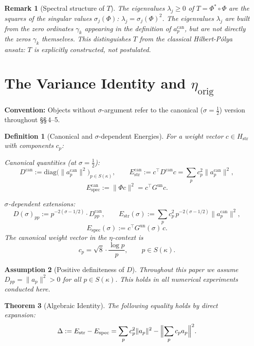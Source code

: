 \documentclass[11pt]{article}
\newtheorem{theorem}{Theorem}[section]
\newtheorem{definition}[theorem]{Definition}
\newtheorem{assumption}[theorem]{Assumption}
\newtheorem*{remark}{Remark}
\newcommand{\Hstr}{H_{\mathrm{str}}}
\newcommand{\Estr}{E_{\mathrm{str}}}
\newcommand{\Espec}{E_{\mathrm{spec}}}
\newcommand{\etaorig}{\eta_{\mathrm{orig}}}
\newcommand{\Gun}{G^{\mathrm{un}}}
\newcommand{\acan}{a_p^{\mathrm{can}}}
\newcommand{\Dcan}{D^{\mathrm{can}}}
\newcommand{\Estrcan}{\Estr^{\mathrm{can}}}
\newcommand{\Especcan}{\Espec^{\mathrm{can}}}
\begin{document}
\begin{remark}[Spectral structure of $T$]
The eigenvalues $\lambda_j\geq 0$ of $T=\Phi^*\circ\Phi$ are the squares of
the singular values $\sigma_j(\Phi)$: $\lambda_j=\sigma_j(\Phi)^2$.
The eigenvalues $\lambda_j$ are built from the zero ordinates $\gamma_k$
appearing in the definition of $\acan$, but are \emph{not} directly the zeros
$\gamma_k$ themselves. This distinguishes $T$ from the classical Hilbert-P\'olya
ansatz: $T$ is explicitly constructed, not postulated.
\end{remark}

\section{The Variance Identity and $\etaorig$}

\textbf{Convention:} Objects without $\sigma$-argument refer to the canonical
($\sigma=\tfrac12$) version throughout \S\S\,4--5.

\begin{definition}[Canonical and $\sigma$-dependent Energies]
\label{def:energies}
For a weight vector $c\in\Hstr$ with components $c_p$:

\emph{Canonical quantities} (at $\sigma=\tfrac12$):
\[
\Dcan:=\mathrm{diag}\!\bigl(\|\acan\|^2\bigr)_{p\in S(\kappa)},
\qquad
\Estrcan:=c^\top\Dcan c=\sum_p c_p^2\|\acan\|^2,
\]
\[
\Especcan:=\|\Phi c\|^2=c^\top\Gun c.
\]

\emph{$\sigma$-dependent extensions:}
\[
D(\sigma)_{pp}:=p^{-2(\sigma-1/2)}\cdot\Dcan_{pp},
\qquad
\Estr(\sigma):=\sum_p c_p^2\,p^{-2(\sigma-1/2)}\|\acan\|^2,
\]
\[
\Espec(\sigma):=c^\top\Gun(\sigma)\,c.
\]
The \emph{canonical weight vector} in the $\eta$-context is
\[
c_p=\sqrt{8}\cdot\frac{\log p}{p},\qquad p\in S(\kappa).
\]
\end{definition}

\begin{assumption}[Positive definiteness of $D$]
Throughout this paper we assume $D_{pp}=\|a_p\|^2>0$ for all
$p\in S(\kappa)$. This holds in all numerical experiments conducted here.
\end{assumption}

\begin{theorem}[Algebraic Identity]
\label{thm:identity}
The following equality holds by direct expansion:
\[
\Delta:=\Estr-\Espec=\sum_p c_p^2\|a_p\|^2-\Bigl\|\sum_p c_p a_p\Bigr\|^2.
\]
\end{theorem}
\end{document}
